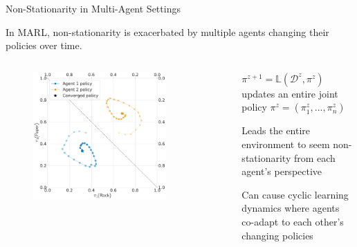 \begin{frame}{Non-Stationarity in Multi-Agent Settings}

In MARL, non-stationarity is exacerbated by multiple agents changing their policies over time.
\vspace{0pt}
\begin{columns}
\begin{column}{0.5\textwidth}
    \begin{figure}
        \includegraphics[width=0.8\textwidth, height = 0.8\textheight, keepaspectratio]{images/chapter_5/wolfphc_rps_own.pdf}

    \end{figure}
\end{column}

\begin{column}{0.5\textwidth}
\blist
    \item $\pi^{z+1} = \mathbb{L}(\mathcal{D}^z, \pi^z)$ updates an entire joint policy $\pi^z = (\pi_1^z, ..., \pi_n^z)$
    \item Leads the entire environment to seem non-stationarity from each agent's perspective
    \item Can cause cyclic learning dynamics where agents co-adapt to each other's changing policies 
\elist
\end{column}
\end{columns}
\end{frame}

